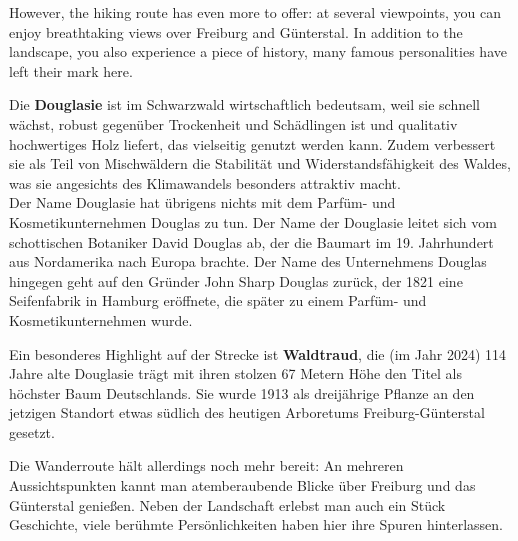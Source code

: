 \documentclass[landscape, a4paper]{article}
\newcommand\alert[1]{\textcolor{PrimaryColor}{\textbf{#1}}}
\begin{document}
\begin{minipage}[t]{0.31\textwidth}
{However, the hiking route has even more to offer: at several viewpoints, you can enjoy breathtaking views over Freiburg and Günterstal. In addition to the landscape, you also experience a piece of history, many famous personalities have left their mark here.
}{
	Die \alert{Douglasie} ist im Schwarzwald wirtschaftlich bedeutsam, weil sie schnell wächst, robust gegenüber Trockenheit und Schädlingen ist und qualitativ hochwertiges Holz liefert, das vielseitig genutzt werden kann. Zudem verbessert sie als Teil von Mischwäldern die Stabilität und Widerstandsfähigkeit des Waldes, was sie angesichts des Klimawandels besonders attraktiv macht.\\
	Der Name Douglasie hat übrigens nichts mit dem Parfüm- und Kosmetikunternehmen Douglas zu tun. Der Name der Douglasie leitet sich vom schottischen Botaniker David Douglas ab, der die Baumart im 19. Jahrhundert aus Nordamerika nach Europa brachte. Der Name des Unternehmens Douglas hingegen geht auf den Gründer John Sharp Douglas zurück, der 1821 eine Seifenfabrik in Hamburg eröffnete, die später zu einem Parfüm- und Kosmetikunternehmen wurde.

	Ein besonderes Highlight auf der Strecke ist \alert{Waldtraud}, die (im Jahr 2024) 114 Jahre alte Douglasie trägt mit ihren stolzen 67 Metern Höhe den Titel als höchster Baum Deutschlands. Sie wurde 1913 als dreijährige Pflanze an den jetzigen Standort etwas südlich des heutigen Arboretums Freiburg-Günterstal gesetzt.

	Die Wanderroute hält allerdings noch mehr bereit: An mehreren Aussichtspunkten kannt man atemberaubende Blicke über Freiburg und das Günterstal genießen. Neben der Landschaft erlebst man auch ein Stück Geschichte, viele berühmte Persönlichkeiten haben hier ihre Spuren hinterlassen.
}

\end{minipage}%
\hfill\color{white}%
\vrule width 0.01cm
\hfill\color{black}%
\end{document}
